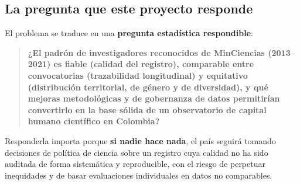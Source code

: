 \subsection{La pregunta que este proyecto responde}

El problema se traduce en una \textbf{pregunta estadística respondible}:

\begin{quote}
\textbf{¿El padrón de investigadores reconocidos de MinCiencias
(2013--2021) es fiable (calidad del registro), comparable entre convocatorias
(trazabilidad longitudinal) y equitativo (distribución territorial, de género
y de diversidad), y qué mejoras metodológicas y de gobernanza de datos
permitirían convertirlo en la base sólida de un observatorio de capital
humano científico en Colombia?}
\end{quote}

Responderla importa porque \textbf{si nadie hace nada}, el país seguirá
tomando decisiones de política de ciencia sobre un registro cuya calidad no ha
sido auditada de forma sistemática y reproducible, con el riesgo de perpetuar
inequidades y de basar evaluaciones individuales en datos no comparables.
